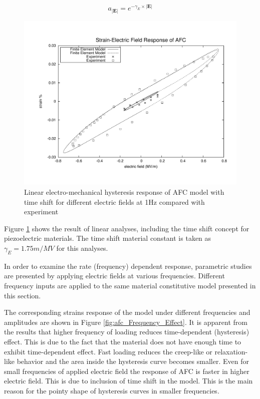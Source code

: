 \begin{equation}
a_{ |\textbf {E}| }=e^{-\gamma_{E} \times |\textbf {E}|}
\label{equation:time_scaling_factor}	
\end{equation}
 
\begin{figure} 
\centering
\includegraphics[trim = 0mm 0mm 0mm 0mm,width=5.0in]
{./chap_4_structural_analyses/afc_unit_cell/linear_hysteris_time_shift_afc/time_shift_afc_electric_field_vs_strains.pdf}
\caption{Linear electro-mechanical hysteresis response of AFC model with time shift for different electric fields at 1Hz compared with experiment}
\label{fig:time_shift_afc_electric_field_vs_strains}
\end{figure}

Figure \ref{fig:time_shift_afc_electric_field_vs_strains} shows the result of linear analyses, including the time shift concept for piezoelectric materials.
The time shift material constant is taken as $\gamma_{E}=1.75 m/MV$ for this analyses.

In order to examine the rate (frequency) dependent response, parametric studies are presented by applying electric fields at various frequencies. 
Different frequency inputs are applied to the same material constitutive model presented in this section. 

The corresponding strains response of the model under different frequencies and amplitudes are shown in Figure \ref{fig:afc_Frequency_Effect}. 
It is apparent from the results that higher frequency of loading reduces time-dependent (hysteresis) effect. 
This is due to the fact that the material does not have enough time to exhibit time-dependent effect. 
Fast loading reduces the creep-like or relaxation-like behavior and the area inside the hysteresis curve becomes smaller. 
Even for small frequencies of applied electric field the response of AFC is faster in higher electric field. 
This is due to inclusion of time shift in the model. 
This is the main reason for the pointy shape of hysteresis curves in smaller frequencies. 

